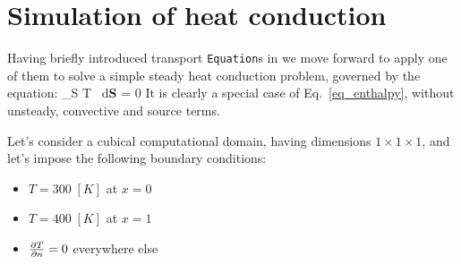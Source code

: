 \section{Simulation of heat conduction}
\label{sec_conduction}

Having briefly introduced transport {\tt Equation}s in {\psiboil} we move
forward to apply one of them to solve a simple steady heat conduction 
problem, governed by the equation:
%
\be
         \int_S \lambda \nabla T \, d{\bf S}
       = 0           
       \; \; \; \;
       [W]
  \label{eq_conduction}
\ee
%
It is clearly a special case of Eq.~\ref{eq_enthalpy}, without unsteady,
convective and source terms.

Let's consider a cubical computational domain, having dimensions 
$1 \times 1 \times 1$, and let's impose the following boundary conditions:
%
\begin{itemize}
  \item $T = 300 \; [K]$ at $x = 0$
  \item $T = 400 \; [K]$ at $x = 1$
  \item $\frac{\partial T}{\partial n} = 0$ everywhere else
\end{itemize}

